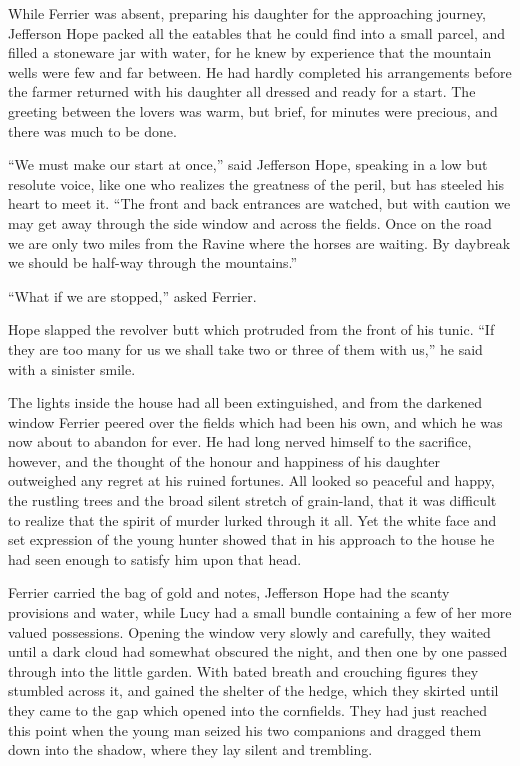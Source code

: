 \documentclass[12pt,english,oneside]{book}
\begin{document}
While Ferrier was absent, preparing his daughter for the approaching
journey, Jefferson Hope packed all the eatables that he could find
into a small parcel, and filled a stoneware jar with water, for he
knew by experience that the mountain wells were few and far between.
He had hardly completed his arrangements before the farmer returned
with his daughter all dressed and ready for a start. The greeting
between the lovers was warm, but brief, for minutes were precious,
and there was much to be done.

{}``We must make our start at once,'' said Jefferson Hope, speaking
in a low but resolute voice, like one who realizes the greatness of
the peril, but has steeled his heart to meet it. {}``The front and
back entrances are watched, but with caution we may get away through
the side window and across the fields. Once on the road we are only
two miles from the Ravine where the horses are waiting. By daybreak
we should be half-way through the mountains.''

{}``What if we are stopped,'' asked Ferrier.

Hope slapped the revolver butt which protruded from the front of his
tunic. {}``If they are too many for us we shall take two or three
of them with us,'' he said with a sinister smile.

The lights inside the house had all been extinguished, and from the
darkened window Ferrier peered over the fields which had been his
own, and which he was now about to abandon for ever. He had long nerved
himself to the sacrifice, however, and the thought of the honour and
happiness of his daughter outweighed any regret at his ruined fortunes.
All looked so peaceful and happy, the rustling trees and the broad
silent stretch of grain-land, that it was difficult to realize that
the spirit of murder lurked through it all. Yet the white face and
set expression of the young hunter showed that in his approach to
the house he had seen enough to satisfy him upon that head.

Ferrier carried the bag of gold and notes, Jefferson Hope had the
scanty provisions and water, while Lucy had a small bundle containing
a few of her more valued possessions. Opening the window very slowly
and carefully, they waited until a dark cloud had somewhat obscured
the night, and then one by one passed through into the little garden.
With bated breath and crouching figures they stumbled across it, and
gained the shelter of the hedge, which they skirted until they came
to the gap which opened into the cornfields. They had just reached
this point when the young man seized his two companions and dragged
them down into the shadow, where they lay silent and trembling.
\end{document}
